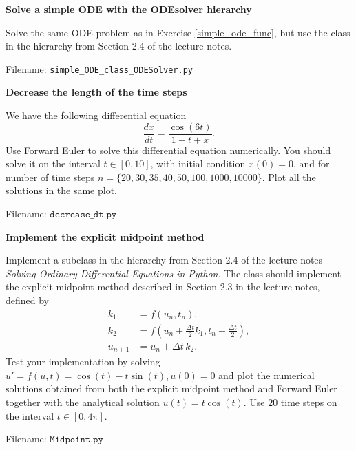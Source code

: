 \begin{Problem}{\textbf{Solve a simple ODE with the ODEsolver hierarchy}}

\noindent
Solve the same ODE problem as in Exercise \ref{simple_ode_func}, but use the
 class in the  hierarchy
from Section 2.4 of the lecture notes.

Filename: \texttt{simple\_ODE\_class\_ODESolver.py}
\end{Problem}


\begin{Problem}{\textbf{Decrease the length of the time steps}}

\noindent We have the following differential equation
\begin{equation*}
\frac{dx}{dt} = \frac{\cos (6t)}{1 + t + x}.
\end{equation*}
Use Forward Euler to solve this differential equation numerically. You should solve it on the interval $t \in [0, 10]$, with initial condition $x(0) = 0$, and for number of time steps $n = \{20, 30, 35, 40, 50, 100, 1 000, 10 000\}$. Plot all the solutions in the same plot.

Filename: $\texttt{decrease\_dt.py}$
\end{Problem}

\begin{Problem}{\textbf{Implement the explicit midpoint method}}\label{Midpoint}

\noindent Implement a subclass  in the  hierarchy
from Section 2.4 of the lecture notes \emph{Solving Ordinary Differential Equations in Python}. The class
should implement the explicit midpoint method described in Section 2.3 in the lecture notes, defined
by
\begin{align*}
k_1 & = f(u_n, t_n), \\
k_2 & = f(u_n+\frac{\Delta t}{2} k_1, t_n+\frac{\Delta t}{2}), \\
u_{n+1} &= u_n + \Delta t\, k_2 .
\end{align*}
Test your implementation by solving $u' = f(u, t) = \cos(t)-t\sin(t), u(0) = 0$
and plot the numerical solutions obtained from both the explicit midpoint
method and Forward Euler together with the analytical solution
$u(t) = t\cos(t)$. Use $20$ time steps on the interval $t \in [0, 4\pi]$.

Filename: $\texttt{Midpoint.py}$
\end{Problem}

